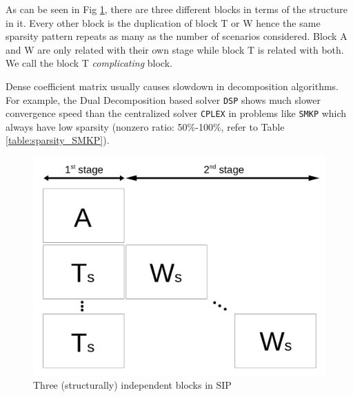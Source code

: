 

As can be seen in Fig \ref{fig:stagewise_sparsity}, there are three different blocks in terms of the structure in it. Every other block is the duplication of block T or W hence the same sparsity pattern repeats as many as the number of scenarios considered. Block A and W are only related with their own stage while block T is related with both. We call the block T \textit{complicating} block. 

Dense coefficient matrix usually causes slowdown in decomposition algorithms. For example, the Dual Decomposition based solver \texttt{DSP} shows much slower convergence speed than the centralized solver \texttt{CPLEX} in problems like \texttt{SMKP} which always have low sparsity (nonzero ratio: 50\%-100\%, refer to Table \ref{table:sparsity_SMKP}).
\begin{figure}
	\centering
	\includegraphics[width=0.7\linewidth]{drawings/stagewise_sparsity}
	\caption{Three (structurally) independent blocks in SIP}
	\label{fig:stagewise_sparsity}
\end{figure}









